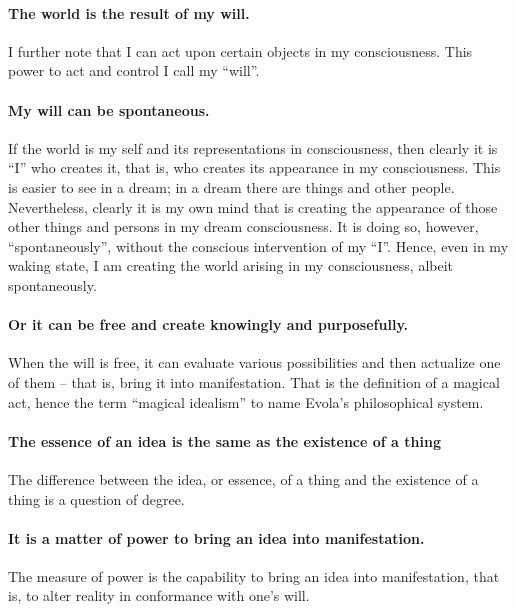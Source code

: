 \paragraph{The world is the result of my will.}


I further note that I can act upon certain objects in my consciousness. This power to act and control I call my ``will''.

\paragraph{My will can be spontaneous.}


If the world is my self and its representations in consciousness, then clearly it is ``I'' who creates it, that is, who creates its appearance in my consciousness. This is easier to see in a dream; in a dream there are things and other people. Nevertheless, clearly it is my own mind that is creating the appearance of those other things and persons in my dream consciousness. It is doing so, however, ``spontaneously'', without the conscious intervention of my ``I''. Hence, even in my waking state, I am creating the world arising in my consciousness, albeit spontaneously.

\paragraph{Or it can be free and create knowingly and purposefully.}


When the will is free, it can evaluate various possibilities and then actualize one of them -- that is, bring it into manifestation. That is the definition of a magical act, hence the term ``magical idealism'' to name Evola's philosophical system.

\paragraph{The essence of an idea is the same as the existence of a thing}


The difference between the idea, or essence, of a thing and the existence of a thing is a question of degree.

\paragraph{It is a matter of power to bring an idea into manifestation.}


The measure of power is the capability to bring an idea into manifestation, that is, to alter reality in conformance with one's will.

